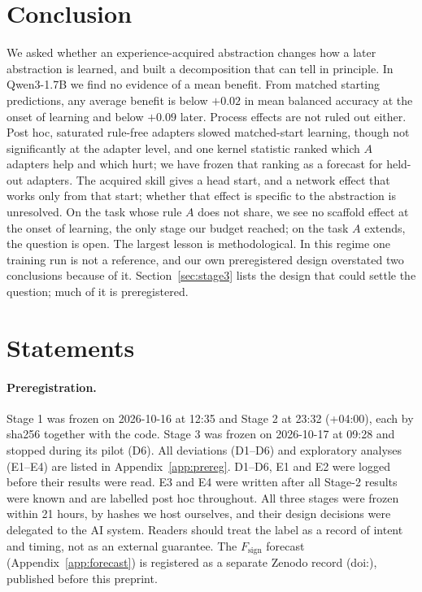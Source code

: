 \documentclass[11pt]{article}
\begin{document}
\section{Conclusion}
We asked whether an experience-acquired abstraction changes how a later abstraction is learned, and built a decomposition that can tell in principle. In Qwen3-1.7B we find no evidence of a mean benefit. From matched starting predictions, any average benefit is below $+0.02$ in mean balanced accuracy at the onset of learning and below $+0.09$ later. Process effects are not ruled out either. Post hoc, saturated rule-free adapters slowed matched-start learning, though not significantly at the adapter level, and one kernel statistic ranked which $A$ adapters help and which hurt; we have frozen that ranking as a forecast for held-out adapters. The acquired skill gives a head start, and a network effect that works only from that start; whether that effect is specific to the abstraction is unresolved. On the task whose rule $A$ does not share, we see no scaffold effect at the onset of learning, the only stage our budget reached; on the task $A$ extends, the question is open. The largest lesson is methodological. In this regime one training run is not a reference, and our own preregistered design overstated two conclusions because of it. Section~\ref{sec:stage3} lists the design that could settle the question; much of it is preregistered.

\section*{Statements}
\paragraph{Preregistration.} Stage 1 was frozen on 2026-10-16 at 12:35 and Stage 2 at 23:32 (+04:00), each by sha256 together with the code. Stage 3 was frozen on 2026-10-17 at 09:28 and stopped during its pilot (D6). All deviations (D1--D6) and exploratory analyses (E1--E4) are listed in Appendix~\ref{app:prereg}. D1--D6, E1 and E2 were logged before their results were read. E3 and E4 were written after all Stage-2 results were known and are labelled post hoc throughout. All three stages were frozen within 21 hours, by hashes we host ourselves, and their design decisions were delegated to the AI system. Readers should treat the label as a record of intent and timing, not as an external guarantee. The $F_{\text{sign}}$ forecast (Appendix~\ref{app:forecast}) is registered as a separate Zenodo record (doi:\forecastdoi), published before this preprint.
\end{document}

